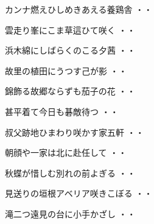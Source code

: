 \begin{shiika}カンナ燃えひしめきあえる養鶏舎
\hfill{・・}\end{shiika}
\vspace{0.6cm}
\begin{shiika}雲走り峯にこま草這ひて咲く
\hfill{・・}\end{shiika}
\vspace{0.6cm}
\begin{shiika}浜木綿にしばらくのこる夕茜
\hfill{・・}\end{shiika}
\vspace{0.6cm}
\begin{shiika}故里の植田にうつす己が影
\hfill{・・}\end{shiika}
\vspace{0.6cm}
\begin{shiika}錦飾る故郷ならずも茄子の花
\hfill{・・}\end{shiika}
\vspace{0.6cm}
\begin{shiika}甚平着て今日も碁敵待つ
\hfill{・・}\end{shiika}
\vspace{0.6cm}
\begin{shiika}叔父跡地ひまわり咲かす家五軒
\hfill{・・}\end{shiika}
\vspace{0.6cm}
\begin{shiika}朝顔や一家は北に赴任して
\hfill{・・}\end{shiika}
\vspace{0.6cm}
\begin{shiika}秋蝶が惜しむ別れの前よぎる
\hfill{・・}\end{shiika}
\vspace{0.6cm}
\begin{shiika}見送りの垣根アベリア咲きこぼる
\hfill{・・}\end{shiika}
\vspace{0.6cm}
\begin{shiika}滝二つ遠見の台に小手かざし
\hfill{・・}\end{shiika}
\vspace{0.6cm}
